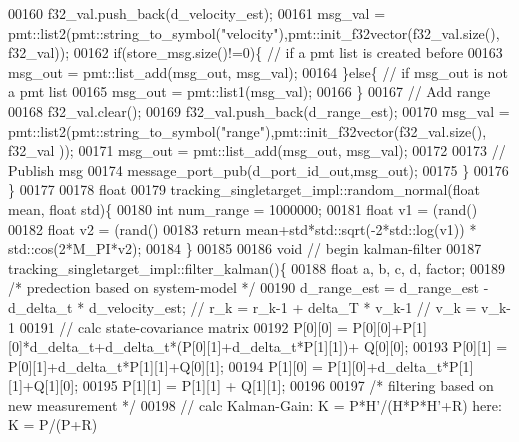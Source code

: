 \begin{DoxyCode}
00160             f32\_val.push\_back(d_velocity_est);
00161             msg\_val = pmt::list2(pmt::string\_to\_symbol(\textcolor{stringliteral}{"velocity"}),pmt::init\_f32vector(f32\_val.size(), 
      f32\_val));
00162             \textcolor{keywordflow}{if}(store\_msg.size()!=0)\{ \textcolor{comment}{// if a pmt list is created before}
00163                 msg\_out = pmt::list\_add(msg\_out, msg\_val);
00164             \}\textcolor{keywordflow}{else}\{ \textcolor{comment}{// if msg\_out is not a pmt list}
00165                 msg\_out = pmt::list1(msg\_val);
00166             \}
00167             \textcolor{comment}{// Add range}
00168             f32\_val.clear();
00169             f32\_val.push\_back(d_range_est);
00170             msg\_val = pmt::list2(pmt::string\_to\_symbol(\textcolor{stringliteral}{"range"}),pmt::init\_f32vector(f32\_val.size(), f32\_val
      ));
00171             msg\_out = pmt::list\_add(msg\_out, msg\_val);
00172             
00173             \textcolor{comment}{// Publish msg}
00174             message\_port\_pub(d_port_id_out,msg\_out);
00175         \}
00176     \}
00177     
00178     \textcolor{keywordtype}{float}
00179     tracking_singletarget_impl::random_normal(\textcolor{keywordtype}{float} mean, \textcolor{keywordtype}{float} std)\{
00180         \textcolor{keywordtype}{int} num\_range = 1000000;
00181         \textcolor{keywordtype}{float} v1 = (rand()%
00182         \textcolor{keywordtype}{float} v2 = (rand()%
00183         \textcolor{keywordflow}{return} mean+std*std::sqrt(-2*std::log(v1)) * std::cos(2*M\_PI*v2);
00184     \}
00185     
00186     \textcolor{keywordtype}{void} \textcolor{comment}{// begin kalman-filter}
00187     tracking_singletarget_impl::filter_kalman()\{
00188         \textcolor{keywordtype}{float} a, b, c, d, factor;
00189         \textcolor{comment}{/* predection based on system-model */}
00190         d_range_est = d_range_est - d_delta_t * d_velocity_est; \textcolor{comment}{// r\_k = r\_k-1 + delta\_T * v\_k-1 // v\_k =
       v\_k-1 }
00191         \textcolor{comment}{// calc state-covariance matrix}
00192         P[0][0] = P[0][0]+P[1][0]*d_delta_t+d_delta_t*(P[0][1]+d_delta_t*P[1][1])+
      Q[0][0];
00193         P[0][1] = P[0][1]+d_delta_t*P[1][1]+Q[0][1];
00194         P[1][0] = P[1][0]+d_delta_t*P[1][1]+Q[1][0];
00195         P[1][1] = P[1][1] + Q[1][1];
00196         
00197         \textcolor{comment}{/*  filtering based on new measurement */}
00198         \textcolor{comment}{// calc Kalman-Gain: K = P*H'/(H*P*H'+R) here: K = P/(P+R)}

\end{DoxyCode}

